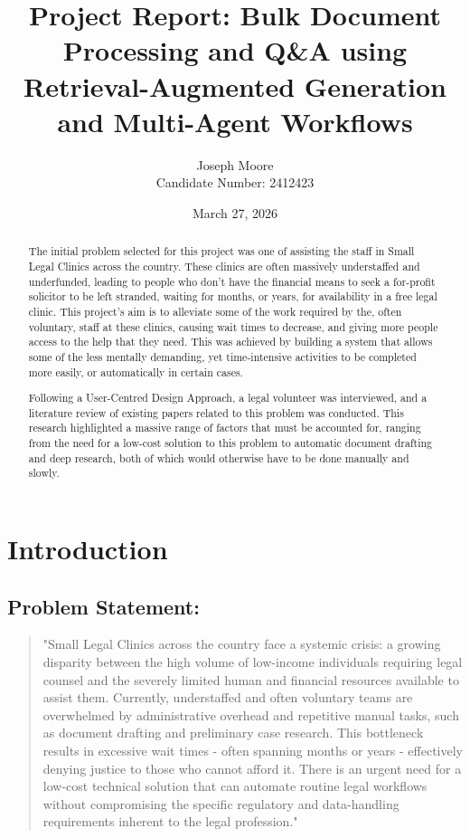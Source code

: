 \documentclass[11pt,a4paper]{article}
\title{Project Report: Bulk Document Processing and Q\&A using Retrieval-Augmented Generation and Multi-Agent Workflows}
\author{Joseph Moore \\ \small Candidate Number: 2412423}
\date{March 27, 2026}
\begin{document}
\maketitle

\begin{abstract}

The initial problem selected for this project was one of assisting the staff in Small Legal Clinics across the country. These clinics are often massively understaffed and underfunded, leading to people who don't have the financial means to seek a for-profit solicitor to be left stranded, waiting for months, or years, for availability in a free legal clinic. This project's aim is to alleviate some of the work required by the, often voluntary, staff at these clinics, causing wait times to decrease, and giving more people access to the help that they need. This was achieved by building a system that allows some of the less mentally demanding, yet time-intensive activities to be completed more easily, or automatically in certain cases.\par

Following a User-Centred Design Approach, a legal volunteer was interviewed, and a literature review of existing papers related to this problem was conducted. This research highlighted a massive range of factors that must be accounted for, ranging from the need for a low-cost solution to this problem to automatic document drafting and deep research, both of which would otherwise have to be done manually and slowly.

\end{abstract}

\section{Introduction}
\label{sec:intro}

\subsection{Problem Statement:}

\begin{quote}
"Small Legal Clinics across the country face a systemic crisis: a growing disparity between the high volume of low-income individuals requiring legal counsel and the severely limited human and financial resources available to assist them. Currently, understaffed and often voluntary teams are overwhelmed by administrative overhead and repetitive manual tasks, such as document drafting and preliminary case research. This bottleneck results in excessive wait times - often spanning months or years - effectively denying justice to those who cannot afford it. There is an urgent need for a low-cost technical solution that can automate routine legal workflows without compromising the specific regulatory and data-handling requirements inherent to the legal profession."
\end{quote}
\end{document}
